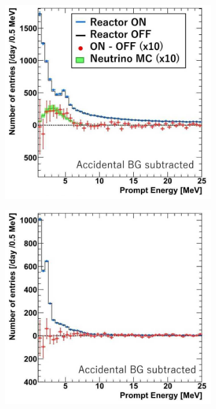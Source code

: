 \begin{figure}[!h]
\centering
\begin{subfigure}{.4\textwidth}
  \centering
  \includegraphics[width=\linewidth]{Chapter1/Figs/Panda_spectrumOfIbdCandidates.png}
  \captionsetup{width=.9\linewidth}
  \caption{}
  \label{subFig:Panda_spectrumOfIbdCandidates}
\end{subfigure}%
\begin{subfigure}{.4\textwidth}
  \centering
\includegraphics[width=\linewidth]{Chapter1/Figs/Panda_SpectrumOfCosmicProducts.png}

\end{subfigure}
\end{figure}
